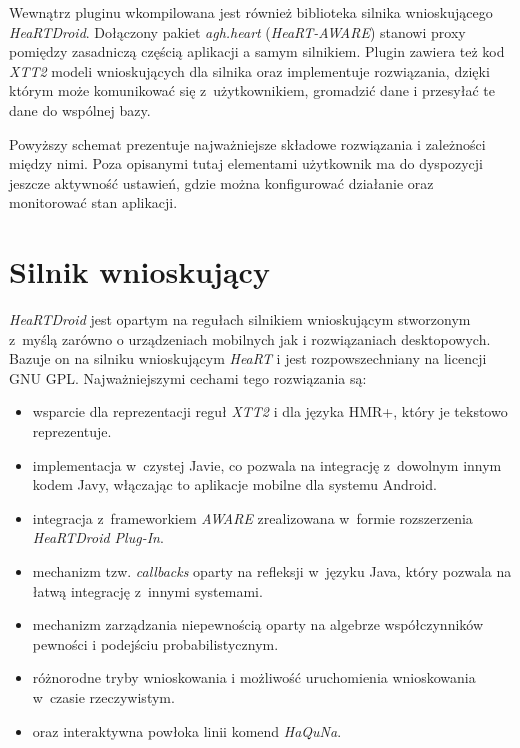 Wewnątrz pluginu wkompilowana jest również biblioteka silnika wnioskującego \textit{HeaRTDroid}. Dołączony pakiet \textit{agh.heart} (\textit{HeaRT-AWARE}) stanowi proxy pomiędzy zasadniczą częścią aplikacji a samym silnikiem. Plugin zawiera też kod \textit{XTT2} modeli wnioskujących dla silnika oraz implementuje rozwiązania, dzięki którym może komunikować się z~użytkownikiem, gromadzić dane i przesyłać te dane do wspólnej bazy. 

Powyższy schemat prezentuje najważniejsze składowe rozwiązania i zależności między nimi. Poza opisanymi tutaj elementami użytkownik ma do dyspozycji jeszcze aktywność ustawień, gdzie można konfigurować działanie oraz monitorować stan aplikacji.



\section{Silnik wnioskujący}
\label{sec:silnikWnioskujacy}

\textit{HeaRTDroid} jest opartym na regułach silnikiem wnioskującym stworzonym z~myślą zarówno o urządzeniach mobilnych jak i rozwiązaniach desktopowych. Bazuje on na silniku wnioskującym \textit{HeaRT} i jest rozpowszechniany na licencji GNU GPL. Najważniejszymi cechami tego rozwiązania są\cite{heartdroid}:

\begin{itemize}
	\item wsparcie dla reprezentacji reguł \textit{XTT2} i dla języka HMR+, który je tekstowo reprezentuje.
	
	\item implementacja w~czystej Javie, co pozwala na integrację z~dowolnym innym kodem Javy, włączając to aplikacje mobilne dla systemu Android.
	
	\item integracja z~frameworkiem \textit{AWARE} zrealizowana w~formie rozszerzenia \textit{HeaRTDroid Plug-In}.
	
	\item mechanizm tzw. \textit{callbacks} oparty na refleksji w~języku Java, który pozwala na łatwą integrację z~innymi systemami.
	
	\item mechanizm zarządzania niepewnością oparty na algebrze współczynników pewności i podejściu probabilistycznym.
	
	\item różnorodne tryby wnioskowania i możliwość uruchomienia wnioskowania w~czasie rzeczywistym.
	
	\item oraz interaktywna powłoka linii komend \textit{HaQuNa}\cite{heartdroid}.
\end{itemize}

